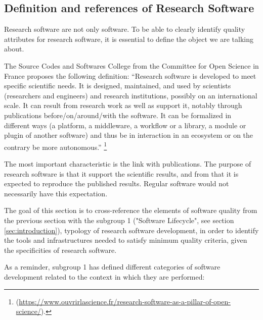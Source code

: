 \subsection{Definition and references of Research Software}

Research software are not only software. To be able to clearly
identify quality attributes for research software, it is essential to
define the object we are talking about.

The Source Codes and Softwares College from the Committee for Open
Science in France proposes the following definition: 
``Research software is developed to meet specific scientific needs. It
is designed, maintained, and used by scientists (researchers and
engineers) and research institutions, possibly on an international
scale. It can result from research work as well as support it, notably
through publications before/on/around/with the software. It can be
formalized in different ways (a platform, a middleware, a workflow or
a library, a module or plugin of another software) and thus be in
interaction in an ecosystem or on the contrary be more
autonomous.'' \footnote{(\url{https://www.ouvrirlascience.fr/research-software-as-a-pillar-of-open-science/}).}

The most important characteristic is the link with publications. The
purpose of research software is that it support the scientific
results, and from that it is expected to reproduce the published
results. Regular software would not necessarily have this expectation.

The goal of this section is to cross-reference the elements of
software quality from the previous section with the subgroup 1
\cite{sg1tf2023} ("Software Lifecycle", see section
\ref{sec:introduction}), typology of research software development, in
order to identify the tools and infrastructures needed to satisfy
minimum quality criteria, given the specificities of research software.  

As a reminder, subgroup 1 has defined different categories of software
development related to the context in which they are performed:

